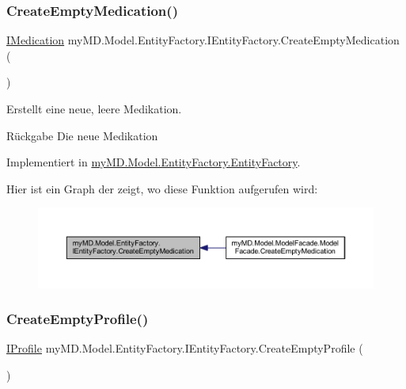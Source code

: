 \subsubsection{\texorpdfstring{Create\+Empty\+Medication()}{CreateEmptyMedication()}}
{\footnotesize\ttfamily \mbox{\hyperlink{interfacemy_m_d_1_1_model_interface_1_1_data_model_interface_1_1_i_medication}{I\+Medication}} my\+M\+D.\+Model.\+Entity\+Factory.\+I\+Entity\+Factory.\+Create\+Empty\+Medication (\begin{DoxyParamCaption}{ }\end{DoxyParamCaption})}



Erstellt eine neue, leere Medikation. 

\begin{DoxyReturn}{Rückgabe}
Die neue Medikation
\end{DoxyReturn}


Implementiert in \mbox{\hyperlink{classmy_m_d_1_1_model_1_1_entity_factory_1_1_entity_factory_a600515af5e312dbafa6dff80dfe5f25e}{my\+M\+D.\+Model.\+Entity\+Factory.\+Entity\+Factory}}.

Hier ist ein Graph der zeigt, wo diese Funktion aufgerufen wird\+:\nopagebreak
\begin{figure}[H]
\begin{center}
\leavevmode
\includegraphics[width=350pt]{interfacemy_m_d_1_1_model_1_1_entity_factory_1_1_i_entity_factory_a02bf5fe00d1c0b40dbc510ce74619a33_icgraph}
\end{center}
\end{figure}
\mbox{\label{interfacemy_m_d_1_1_model_1_1_entity_factory_1_1_i_entity_factory_add734631a85e6021f04c4185f66e351d}} 
\subsubsection{\texorpdfstring{Create\+Empty\+Profile()}{CreateEmptyProfile()}}
{\footnotesize\ttfamily \mbox{\hyperlink{interfacemy_m_d_1_1_model_interface_1_1_data_model_interface_1_1_i_profile}{I\+Profile}} my\+M\+D.\+Model.\+Entity\+Factory.\+I\+Entity\+Factory.\+Create\+Empty\+Profile (\begin{DoxyParamCaption}{ }\end{DoxyParamCaption})}



